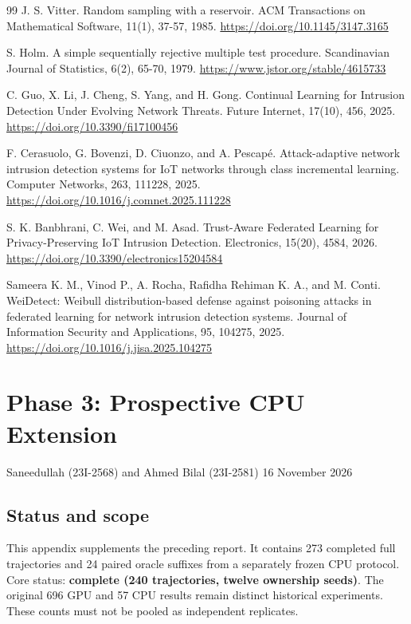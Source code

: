 \documentclass[
  10pt,
  a4paper,
]{article}
\begin{document}
\begin{thebibliography}{99}
 J. S. Vitter. Random sampling with a reservoir. ACM Transactions on Mathematical Software, 11(1), 37-57, 1985. \url{https://doi.org/10.1145/3147.3165}

 S. Holm. A simple sequentially rejective multiple test procedure. Scandinavian Journal of Statistics, 6(2), 65-70, 1979. \url{https://www.jstor.org/stable/4615733}

 C. Guo, X. Li, J. Cheng, S. Yang, and H. Gong. Continual Learning for Intrusion Detection Under Evolving Network Threats. Future Internet, 17(10), 456, 2025. \url{https://doi.org/10.3390/fi17100456}

 F. Cerasuolo, G. Bovenzi, D. Ciuonzo, and A. Pescapé. Attack-adaptive network intrusion detection systems for IoT networks through class incremental learning. Computer Networks, 263, 111228, 2025. \url{https://doi.org/10.1016/j.comnet.2025.111228}

 S. K. Banbhrani, C. Wei, and M. Asad. Trust-Aware Federated Learning for Privacy-Preserving IoT Intrusion Detection. Electronics, 15(20), 4584, 2026. \url{https://doi.org/10.3390/electronics15204584}

 Sameera K. M., Vinod P., A. Rocha, Rafidha Rehiman K. A., and M. Conti. WeiDetect: Weibull distribution-based defense against poisoning attacks in federated learning for network intrusion detection systems. Journal of Information Security and Applications, 95, 104275, 2025. \url{https://doi.org/10.1016/j.jisa.2025.104275}
\end{thebibliography}

\clearpage


\hypertarget{phase-3-prospective-cpu-extension}{%
\section{Phase 3: Prospective CPU
Extension}\label{phase-3-prospective-cpu-extension}}

Saneedullah (23I-2568) and Ahmed Bilal (23I-2581) \textbar{} 16 November
2026

\hypertarget{status-and-scope}{%
\subsection{Status and scope}\label{status-and-scope}}

This appendix supplements the preceding report. It contains 273
completed full trajectories and 24 paired oracle suffixes from a
separately frozen CPU protocol. Core status: \textbf{complete (240
trajectories, twelve ownership seeds)}. The original 696 GPU and 57 CPU
results remain distinct historical experiments. These counts must not be
pooled as independent replicates.
\end{document}
